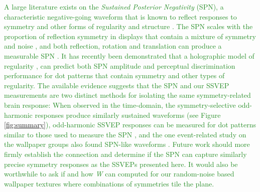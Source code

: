 \documentclass[11pt, twoside]{article}
\begin{document}
\textcolor{ForestGreen}{A large literature exists on the \textit{Sustained Posterior Negativity} (SPN), a characteristic negative-going waveform that is known to reflect responses to symmetry and other forms of regularity and structure \citep{makin_2016}. The SPN scales with the proportion of reflection symmetry in displays that contain a mixture of symmetry and noise \cite{makin_formation_2020, palumbo_scaling_2015}, and both reflection, rotation and translation can produce a measurable SPN \cite{makin_2013}. It has recently been demonstrated that a holographic model of regularity \citep{van_der_helm_1996}, can predict both SPN amplitude \citep{makin_2016} and perceptual discrimination performance \citep{nucci_2007} for dot patterns that contain symmetry and other types of regularity. The available evidence suggests that the SPN and our SSVEP measurements are two distinct methods for isolating the same symmetry-related brain response: When observed in the time-domain, the symmetry-selective odd-harmonic responses produce similarly sustained waveforms (see Figure \ref{fig:summary}), odd-harmonic SSVEP responses can be measured for dot patterns similar to those used to measure the SPN \citep{RN1954}, and the one event-related study on the wallpaper groups also found SPN-like waveforms \citep{RN1959}. Future work should more firmly establish the connection and determine if the SPN can capture similarly precise symmetry responses as the SSVEPs presented here. It would also be worthwhile to ask if and how \textit{W} can computed for our random-noise based wallpaper textures where combinations of symmetries tile the plane.}    
\end{document}
